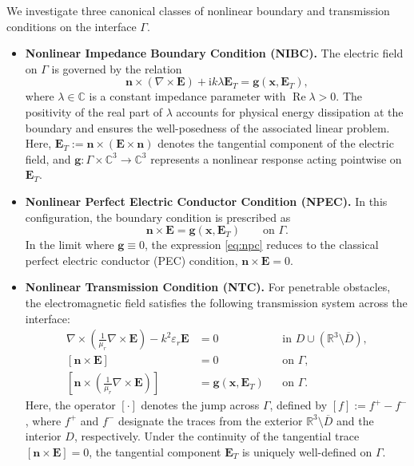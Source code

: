 \documentclass[10pt,a4paper]{amsart}
\numberwithin{equation}{section}
\begin{document}
We investigate three canonical classes of nonlinear boundary and transmission conditions on the interface $\Gamma$.

\begin{itemize}
    \item \textbf{Nonlinear Impedance Boundary Condition (NIBC).} 
    The electric field on $\Gamma$ is governed by the relation
    \begin{equation}\label{eq:NIBC}
        \mathbf{n} \times (\nabla \times \mathbf{E}) + \mathrm{i}k\lambda\mathbf{E}_T = \mathbf{g}(\boldsymbol{x}, \mathbf{E}_T),
    \end{equation}
    where $\lambda \in \mathbb{C}$ is a constant impedance parameter with $\operatorname{Re}\lambda > 0$. The positivity of the real part of $\lambda$ accounts for physical energy dissipation at the boundary and ensures the well-posedness of the associated linear problem. Here, $\mathbf{E}_T:= \mathbf{n} \times (\mathbf{E} \times \mathbf{n})$ denotes the tangential component of the electric field, and $\mathbf{g} \colon \Gamma \times \mathbb{C}^3 \to \mathbb{C}^3$ represents a nonlinear response acting pointwise on $\mathbf{E}_T$.

    \item \textbf{Nonlinear Perfect Electric Conductor Condition (NPEC).} 
    In this configuration, the boundary condition is prescribed as
    \begin{equation}\label{eq:npc}
        \mathbf{n} \times \mathbf{E} = \mathbf{g}(\boldsymbol{x}, \mathbf{E}_T) \qquad \text{on } \Gamma.
    \end{equation}
    In the limit where $\mathbf{g} \equiv 0$, the expression \eqref{eq:npc} reduces to the classical perfect electric conductor (PEC) condition, $\mathbf{n} \times \mathbf{E} = 0$.

    \item \textbf{Nonlinear Transmission Condition (NTC).} 
    For penetrable obstacles, the electromagnetic field satisfies the following transmission system across the interface:
    \begin{equation}\label{eq:transmission}
    \begin{aligned}
        \nabla \times \left( \frac{1}{\mu_r} \nabla \times \mathbf{E} \right) - k^2 \varepsilon_r \mathbf{E} &= 0 && \text{in } D \cup (\mathbb{R}^3 \setminus \overline{D}), \\
        [\mathbf{n} \times \mathbf{E}] &= 0 && \text{on } \Gamma, \\
        \left[ \mathbf{n} \times \left( \frac{1}{\mu_r} \nabla \times \mathbf{E} \right) \right] &= \mathbf{g}(\boldsymbol{x}, \mathbf{E}_T) && \text{on } \Gamma.
    \end{aligned}
    \end{equation}
    Here, the operator $[\cdot]$ denotes the jump across $\Gamma$, defined by $[f]:= f^+ - f^-$, where $f^+$ and $f^-$ designate the traces from the exterior $\mathbb{R}^3 \setminus \overline{D}$ and the interior $D$, respectively. Under the continuity of the tangential trace $[\mathbf{n} \times \mathbf{E}] = 0$, the tangential component $\mathbf{E}_T$ is uniquely well-defined on $\Gamma$.


\end{itemize}
\end{document}
